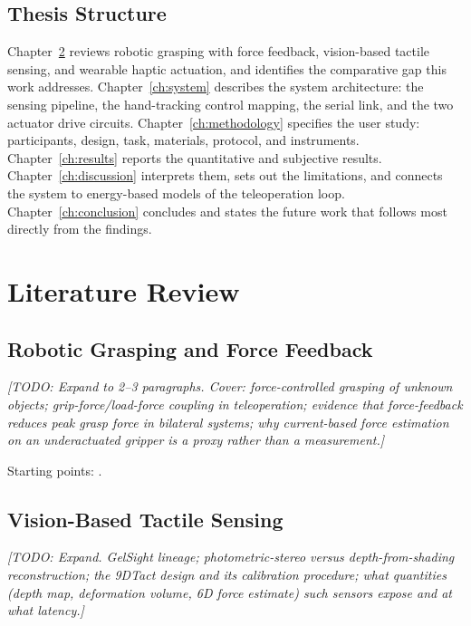 \documentclass[12pt, a4paper, twoside, openright]{report}
\newcommand{\todo}[1]{\textit{[TODO: #1]}}
\begin{document}
\section{Thesis Structure}
\label{sec:structure}

Chapter~\ref{ch:literature} reviews robotic grasping with force feedback,
vision-based tactile sensing, and wearable haptic actuation, and identifies the
comparative gap this work addresses. Chapter~\ref{ch:system} describes the
system architecture: the sensing pipeline, the hand-tracking control mapping,
the serial link, and the two actuator drive circuits.
Chapter~\ref{ch:methodology} specifies the user study: participants, design,
task, materials, protocol, and instruments. Chapter~\ref{ch:results} reports the
quantitative and subjective results. Chapter~\ref{ch:discussion} interprets
them, sets out the limitations, and connects the system to energy-based models
of the teleoperation loop. Chapter~\ref{ch:conclusion} concludes and states the
future work that follows most directly from the findings.

\chapter{Literature Review}
\label{ch:literature}

\section{Robotic Grasping and Force Feedback}
\label{sec:lit-grasping}

\todo{Expand to 2--3 paragraphs. Cover: force-controlled grasping of unknown
    objects; grip-force/load-force coupling in teleoperation; evidence that
    force-feedback reduces peak grasp force in bilateral systems; why current-based
    force estimation on an underactuated gripper is a proxy rather than a
    measurement.}

Starting points: \cite{zheng2024,huang2019,robotiq_manual}.

\section{Vision-Based Tactile Sensing}
\label{sec:lit-vbts}

\todo{Expand. GelSight lineage; photometric-stereo versus depth-from-shading
    reconstruction; the 9DTact design and its calibration procedure; what quantities
    (depth map, deformation volume, 6D force estimate) such sensors expose and at
    what latency.}
\end{document}
